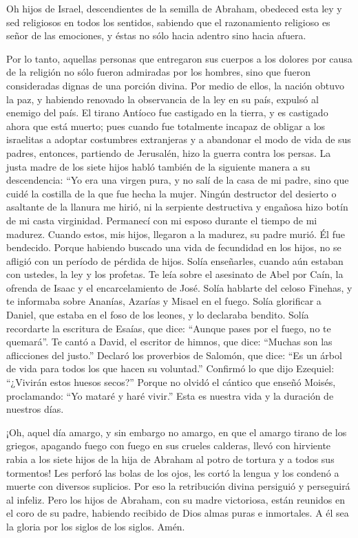  Oh hijos de Israel, descendientes de la semilla de
Abraham, obedeced esta ley y sed religiosos en todos los sentidos,
 sabiendo que el razonamiento religioso es señor de las
emociones, y éstas no sólo hacia adentro sino hacia afuera.

 Por lo tanto, aquellas personas que entregaron sus
cuerpos a los dolores por causa de la religión no sólo fueron admiradas
por los hombres, sino que fueron consideradas dignas de una porción
divina.  Por medio de ellos, la nación obtuvo la paz, y
habiendo renovado la observancia de la ley en su país, expulsó al
enemigo del país.  El tirano Antíoco fue castigado en la
tierra, y es castigado ahora que está muerto; pues cuando fue totalmente
incapaz de obligar a los israelitas a adoptar costumbres extranjeras y a
abandonar el modo de vida de sus padres,  entonces,
partiendo de Jerusalén, hizo la guerra contra los persas. 
La justa madre de los siete hijos habló también de la siguiente manera a
su descendencia: ``Yo era una virgen pura, y no salí de la casa de mi
padre, sino que cuidé la costilla de la que fue hecha la mujer.
 Ningún destructor del desierto o asaltante de la llanura
me hirió, ni la serpiente destructiva y engañosa hizo botín de mi casta
virginidad. Permanecí con mi esposo durante el tiempo de mi madurez.
 Cuando estos, mis hijos, llegaron a la madurez, su padre
murió. Él fue bendecido. Porque habiendo buscado una vida de fecundidad
en los hijos, no se afligió con un período de pérdida de hijos.
 Solía enseñarles, cuando aún estaban con ustedes, la ley
y los profetas.  Te leía sobre el asesinato de Abel por
Caín, la ofrenda de Isaac y el encarcelamiento de José. 
Solía hablarte del celoso Finehas, y te informaba sobre Ananías, Azarías
y Misael en el fuego.  Solía glorificar a Daniel, que
estaba en el foso de los leones, y lo declaraba bendito. 
Solía recordarte la escritura de Esaías, que dice: ``Aunque pases por el
fuego, no te quemará''.  Te cantó a David, el escritor de
himnos, que dice: ``Muchas son las aflicciones del justo.''
 Declaró los proverbios de Salomón, que dice: ``Es un
árbol de vida para todos los que hacen su voluntad.'' 
Confirmó lo que dijo Ezequiel: ``¿Vivirán estos huesos secos?''
 Porque no olvidó el cántico que enseñó Moisés,
proclamando: ``Yo mataré y haré vivir.''  Esta es nuestra
vida y la duración de nuestros días.

 ¡Oh, aquel día amargo, y sin embargo no amargo, en que
el amargo tirano de los griegos, apagando fuego con fuego en sus crueles
calderas, llevó con hirviente rabia a los siete hijos de la hija de
Abraham al potro de tortura y a todos sus tormentos!  Les
perforó las bolas de los ojos, les cortó la lengua y los condenó a
muerte con diversos suplicios.  Por eso la retribución
divina persiguió y perseguirá al infeliz.  Pero los hijos
de Abraham, con su madre victoriosa, están reunidos en el coro de su
padre, habiendo recibido de Dios almas puras e inmortales.
 A él sea la gloria por los siglos de los siglos. Amén.
